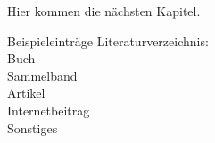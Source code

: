 \documentclass[]{thmreport}
\begin{document}


Hier kommen die nächsten Kapitel.

Beispieleinträge Literaturverzeichnis:\\
Buch \cite{book}\\
Sammelband \cite{incollection}\\
Artikel \cite{article}\\
Internetbeitrag \cite{webpage}\\
Sonstiges \cite{misc}
\end{document}
